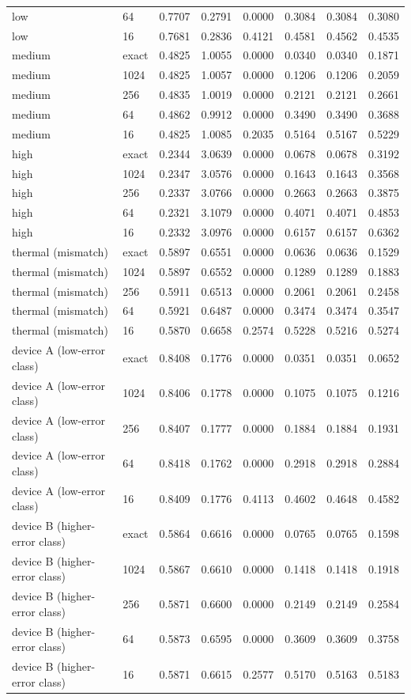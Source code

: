 \begin{table}[!t]
{\begin{tabular}{llrrrrrr}
low & 64 & 0.7707 & 0.2791 & 0.0000 & 0.3084 & 0.3084 & 0.3080 \\
low & 16 & 0.7681 & 0.2836 & 0.4121 & 0.4581 & 0.4562 & 0.4535 \\
medium & exact & 0.4825 & 1.0055 & 0.0000 & 0.0340 & 0.0340 & 0.1871 \\
medium & 1024 & 0.4825 & 1.0057 & 0.0000 & 0.1206 & 0.1206 & 0.2059 \\
medium & 256 & 0.4835 & 1.0019 & 0.0000 & 0.2121 & 0.2121 & 0.2661 \\
medium & 64 & 0.4862 & 0.9912 & 0.0000 & 0.3490 & 0.3490 & 0.3688 \\
medium & 16 & 0.4825 & 1.0085 & 0.2035 & 0.5164 & 0.5167 & 0.5229 \\
high & exact & 0.2344 & 3.0639 & 0.0000 & 0.0678 & 0.0678 & 0.3192 \\
high & 1024 & 0.2347 & 3.0576 & 0.0000 & 0.1643 & 0.1643 & 0.3568 \\
high & 256 & 0.2337 & 3.0766 & 0.0000 & 0.2663 & 0.2663 & 0.3875 \\
high & 64 & 0.2321 & 3.1079 & 0.0000 & 0.4071 & 0.4071 & 0.4853 \\
high & 16 & 0.2332 & 3.0976 & 0.0000 & 0.6157 & 0.6157 & 0.6362 \\
thermal (mismatch) & exact & 0.5897 & 0.6551 & 0.0000 & 0.0636 & 0.0636 & 0.1529 \\
thermal (mismatch) & 1024 & 0.5897 & 0.6552 & 0.0000 & 0.1289 & 0.1289 & 0.1883 \\
thermal (mismatch) & 256 & 0.5911 & 0.6513 & 0.0000 & 0.2061 & 0.2061 & 0.2458 \\
thermal (mismatch) & 64 & 0.5921 & 0.6487 & 0.0000 & 0.3474 & 0.3474 & 0.3547 \\
thermal (mismatch) & 16 & 0.5870 & 0.6658 & 0.2574 & 0.5228 & 0.5216 & 0.5274 \\
device A (low-error class) & exact & 0.8408 & 0.1776 & 0.0000 & 0.0351 & 0.0351 & 0.0652 \\
device A (low-error class) & 1024 & 0.8406 & 0.1778 & 0.0000 & 0.1075 & 0.1075 & 0.1216 \\
device A (low-error class) & 256 & 0.8407 & 0.1777 & 0.0000 & 0.1884 & 0.1884 & 0.1931 \\
device A (low-error class) & 64 & 0.8418 & 0.1762 & 0.0000 & 0.2918 & 0.2918 & 0.2884 \\
device A (low-error class) & 16 & 0.8409 & 0.1776 & 0.4113 & 0.4602 & 0.4648 & 0.4582 \\
device B (higher-error class) & exact & 0.5864 & 0.6616 & 0.0000 & 0.0765 & 0.0765 & 0.1598 \\
device B (higher-error class) & 1024 & 0.5867 & 0.6610 & 0.0000 & 0.1418 & 0.1418 & 0.1918 \\
device B (higher-error class) & 256 & 0.5871 & 0.6600 & 0.0000 & 0.2149 & 0.2149 & 0.2584 \\
device B (higher-error class) & 64 & 0.5873 & 0.6595 & 0.0000 & 0.3609 & 0.3609 & 0.3758 \\
device B (higher-error class) & 16 & 0.5871 & 0.6615 & 0.2577 & 0.5170 & 0.5163 & 0.5183 \\
\bottomrule
\end{tabular}
}
\end{table}
